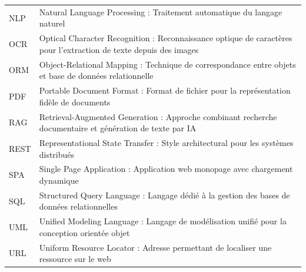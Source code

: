 \begin{longtable}{@{} l p{} @{}}
    NLP & Natural Language Processing : Traitement automatique du langage naturel \\[0.3cm]
    OCR & Optical Character Recognition : Reconnaissance optique de caractères pour l'extraction de texte depuis des images \\[0.3cm]
    ORM & Object-Relational Mapping : Technique de correspondance entre objets et base de données relationnelle \\[0.3cm]
    PDF & Portable Document Format : Format de fichier pour la représentation fidèle de documents \\[0.3cm]
    RAG & Retrieval-Augmented Generation : Approche combinant recherche documentaire et génération de texte par IA \\[0.3cm]
    REST & Representational State Transfer : Style architectural pour les systèmes distribués \\[0.3cm]
    SPA & Single Page Application : Application web monopage avec chargement dynamique \\[0.3cm]
    SQL & Structured Query Language : Langage dédié à la gestion des bases de données relationnelles \\[0.3cm]
    UML & Unified Modeling Language : Langage de modélisation unifié pour la conception orientée objet \\[0.3cm]
    URL & Uniform Resource Locator : Adresse permettant de localiser une ressource sur le web \\[0.3cm]
\end{longtable}
